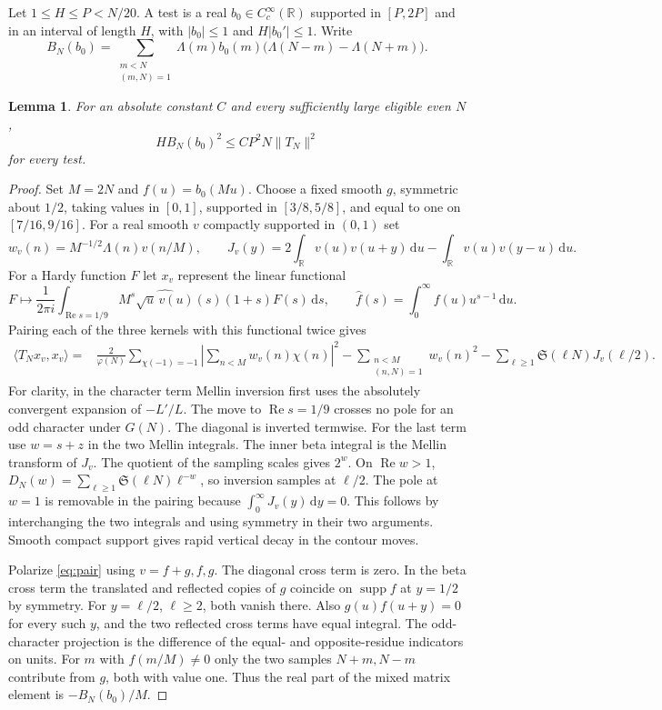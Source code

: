 \documentclass[11pt,a4paper]{article}
\newtheorem{lemma}[theorem]{Lemma}
\newcommand{\SSg}{\mathfrak S}
\newcommand{\dd}{\,\mathrm d}
\DeclareMathOperator{\Rea}{Re}
\DeclareMathOperator{\supp}{supp}
\begin{document}
Let $1\le H\le P<N/20$. A test is a real $b_0\in C^\infty_c(\mathbb R)$ supported in $[P,2P]$ and in an interval of length $H$, with $|b_0|\le1$ and $H|b_0'|\le1$. Write
\[
 B_N(b_0)=\sum_{\substack{m<N\\(m,N)=1}}\Lambda(m)b_0(m)
                 \bigl(\Lambda(N-m)-\Lambda(N+m)\bigr).
\]
\begin{lemma}\label{lm:transfer}
For an absolute constant $C$ and every sufficiently large eligible even $N$,
\begin{equation}\label{eq:transfer}
 H B_N(b_0)^2\le C P^2 N\|T_N\|^2
\end{equation}
for every test.
\end{lemma}
\begin{proof}
Set $M=2N$ and $f(u)=b_0(Mu)$. Choose a fixed smooth $g$, symmetric about $1/2$, taking values in $[0,1]$, supported in $[3/8,5/8]$, and equal to one on $[7/16,9/16]$. For a real smooth $v$ compactly supported in $(0,1)$ set
\[
 w_v(n)=M^{-1/2}\Lambda(n)v(n/M),\qquad
 J_v(y)=2\int_{\mathbb R}v(u)v(u+y)\dd u-\int_{\mathbb R}v(u)v(y-u)\dd u.
\]
For a Hardy function $F$ let $x_v$ represent the linear functional
\[
 F\longmapsto\frac1{2\pi i}\int_{\Rea s=1/9}
 M^s\widehat{\sqrt u\,v(u)}(s)(1+s)F(s)\dd s,\qquad
 \widehat f(s)=\int_0^\infty f(u)u^{s-1}\dd u .
\]
Pairing each of the three kernels with this functional twice gives
\begin{align}
 \langle T_N x_v,x_v\rangle={}&
 \frac{2}{\varphi(N)}\sum_{\chi(-1)=-1}\left|\sum_{n<M}w_v(n)\chi(n)\right|^2
 -\sum_{\substack{n<M\\(n,N)=1}}w_v(n)^2
 -\sum_{\ell\ge1}\SSg(\ell N)J_v(\ell/2).
 \label{eq:pair}
\end{align}
For clarity, in the character term Mellin inversion first uses the absolutely convergent expansion of $-L'/L$. The move to $\Rea s=1/9$ crosses no pole for an odd character under $G(N)$. The diagonal is inverted termwise. For the last term use $w=s+z$ in the two Mellin integrals. The inner beta integral is the Mellin transform of $J_v$. The quotient of the sampling scales gives $2^w$. On $\Rea w>1$, $D_N(w)=\sum_{\ell\ge1}\SSg(\ell N)\ell^{-w}$, so inversion samples at $\ell/2$. The pole at $w=1$ is removable in the pairing because $\int_0^\infty J_v(y)\dd y=0$. This follows by interchanging the two integrals and using symmetry in their two arguments. Smooth compact support gives rapid vertical decay in the contour moves.

Polarize \eqref{eq:pair} using $v=f+g,f,g$. The diagonal cross term is zero. In the beta cross term the translated and reflected copies of $g$ coincide on $\supp f$ at $y=1/2$ by symmetry. For $y=\ell/2$, $\ell\ge2$, both vanish there. Also $g(u)f(u+y)=0$ for every such $y$, and the two reflected cross terms have equal integral. The odd-character projection is the difference of the equal- and opposite-residue indicators on units. For $m$ with $f(m/M)\ne0$ only the two samples $N+m,N-m$ contribute from $g$, both with value one. Thus the real part of the mixed matrix element is $-B_N(b_0)/M$.


\end{proof}
\end{document}
